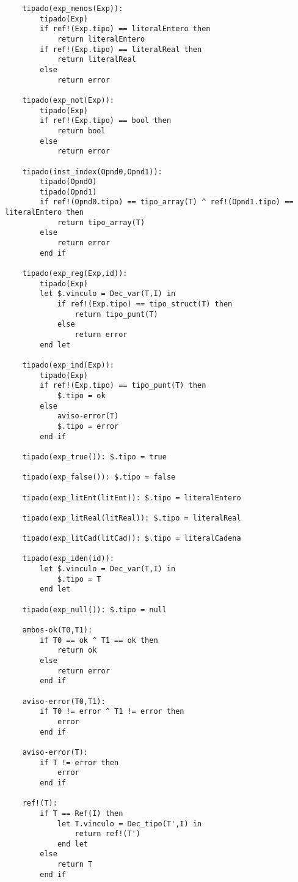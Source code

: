 \begin{lstlisting}
    tipado(exp_menos(Exp)):
        tipado(Exp)
        if ref!(Exp.tipo) == literalEntero then
            return literalEntero
        if ref!(Exp.tipo) == literalReal then
            return literalReal
        else 
            return error

    tipado(exp_not(Exp)):
        tipado(Exp)
        if ref!(Exp.tipo) == bool then
            return bool
        else 
            return error

    tipado(inst_index(Opnd0,Opnd1)):
        tipado(Opnd0)
        tipado(Opnd1)
        if ref!(Opnd0.tipo) == tipo_array(T) ^ ref!(Opnd1.tipo) == literalEntero then
            return tipo_array(T)
        else 
            return error
        end if

    tipado(exp_reg(Exp,id)):
        tipado(Exp)
        let $.vinculo = Dec_var(T,I) in
            if ref!(Exp.tipo) == tipo_struct(T) then
                return tipo_punt(T)
            else 
                return error
        end let

    tipado(exp_ind(Exp)):
        tipado(Exp)
        if ref!(Exp.tipo) == tipo_punt(T) then
            $.tipo = ok
        else
            aviso-error(T)
            $.tipo = error
        end if

    tipado(exp_true()): $.tipo = true

    tipado(exp_false()): $.tipo = false

    tipado(exp_litEnt(litEnt)): $.tipo = literalEntero

    tipado(exp_litReal(litReal)): $.tipo = literalReal

    tipado(exp_litCad(litCad)): $.tipo = literalCadena

    tipado(exp_iden(id)):
        let $.vinculo = Dec_var(T,I) in
            $.tipo = T
        end let

    tipado(exp_null()): $.tipo = null

    ambos-ok(T0,T1):
        if T0 == ok ^ T1 == ok then
            return ok
        else 
            return error
        end if

    aviso-error(T0,T1):
        if T0 != error ^ T1 != error then
            error
        end if

    aviso-error(T):
        if T != error then
            error
        end if 

    ref!(T):
        if T == Ref(I) then
            let T.vinculo = Dec_tipo(T',I) in
                return ref!(T')
            end let
        else
            return T
        end if


\end{lstlisting}
